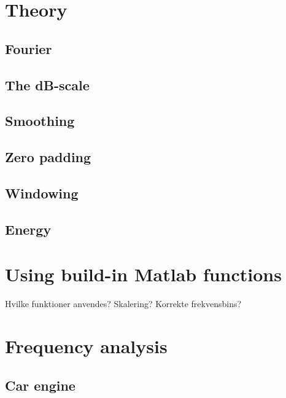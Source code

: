 \section{Theory}
\subsection{Fourier}

\subsection{The dB-scale}

\subsection{Smoothing}

\subsection{Zero padding}

\subsection{Windowing}

\subsection{Energy}

\section{Using build-in Matlab functions}
Hvilke funktioner anvendes?
Skalering?
Korrekte frekvensbins?

\section{Frequency analysis}
\subsection{Car engine}

